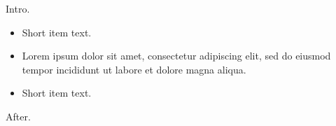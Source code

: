 \documentclass[12pt]{article}
\begin{document}
Intro.
\begin{itemize}[itemsep=6pt,topsep=3pt,parsep=2pt]
\item Short item text.
\item Lorem ipsum dolor sit amet, consectetur adipiscing elit, sed do eiusmod tempor incididunt ut labore et dolore magna aliqua.
\item Short item text.
\end{itemize}
After.
\end{document}
